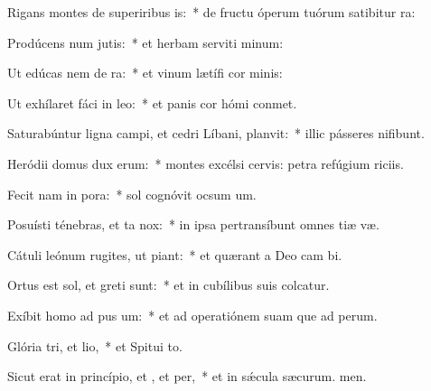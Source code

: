 \item Rigans montes de superiribus is:~* de fructu óperum tuórum satibitur ra:
\item Prodúcens num jutis:~* et herbam serviti minum:
\item Ut edúcas nem de ra:~* et vinum lætífi cor minis:
\item Ut exhílaret fáci in leo:~* et panis cor hómi conmet.
\item Saturabúntur ligna campi, et cedri Líbani,  planvit:~* illic pásseres nifibunt.
\item Heródii domus dux  erum:~* montes excélsi cervis: petra refúgium riciis.
\item Fecit nam in pora:~* sol cognóvit ocsum um.
\item Posuísti ténebras, et ta  nox:~* in ipsa pertransíbunt omnes tiæ væ.
\item Cátuli leónum rugites, ut piant:~* et quærant a Deo cam bi.
\item Ortus est sol, et greti sunt:~* et in cubílibus suis colcatur.
\item Exíbit homo ad pus um:~* et ad operatiónem suam que ad perum.
\item Glória tri, et lio,~* et Spitui to.
\item Sicut erat in princípio, et , et per,~* et in sǽcula sæcurum. men.
